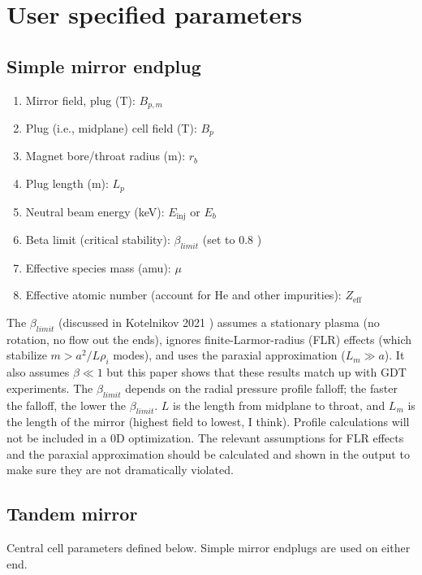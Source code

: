 \section{User specified parameters}

\subsection{Simple mirror endplug}

\begin{enumerate}
    \item Mirror field, plug (T): $B_{p, m}$
    \item Plug (i.e., midplane) cell field (T): $B_p$
    \item Magnet bore/throat radius (m): $r_b$
    \item Plug length (m): $L_p$
    \item Neutral beam energy (keV): $E_{\text{inj}}$ or $E_b$
    \item Beta limit (critical stability): $\beta_{limit}$ (set to 0.8 \cite{KOTELNIKOV_2021})
    \item Effective species mass (amu): $\mu$
    \item Effective atomic number (account for He and other impurities): $Z_{\text{eff}}$
\end{enumerate}

The $\beta_{limit}$ (discussed in Kotelnikov 2021 \cite{KOTELNIKOV_2021}) assumes a stationary plasma (no rotation, no flow out the ends), ignores finite-Larmor-radius (FLR) effects (which stabilize $m > a^2/L \rho_i$ modes), and uses the paraxial approximation ($L_m \gg a$). It also assumes $\beta \ll 1$ but this paper shows that these results match up with GDT experiments. The $\beta_{limit}$ depends on the radial pressure profile falloff; the faster the falloff, the lower the $\beta_{limit}$. $L$ is the length from midplane to throat, and $L_m$ is the length of the mirror (highest field to lowest, I think). Profile calculations will not be included in a 0D optimization. The relevant assumptions for FLR effects and the paraxial approximation should be calculated and shown in the output to make sure they are not dramatically violated.

\subsection{Tandem mirror}

Central cell parameters defined below. Simple mirror endplugs are used on either end.

